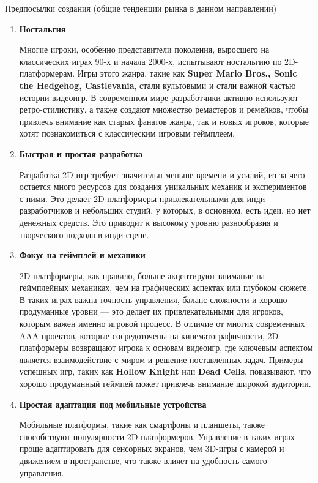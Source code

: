 \item Предпосылки создания (общие тенденции рынка в данном направлении)
\begin{enumerate}
    \item \textbf{Ностальгия} \par
    Многие игроки, особенно представители поколения, выросшего на классических играх 90-х и начала 2000-х, испытывают ностальгию по 2D-платформерам. Игры этого жанра, такие как \textbf{Super Mario Bros., Sonic the Hedgehog, Castlevania}, стали культовыми и стали важной частью истории видеоигр. В современном мире разработчики активно используют ретро-стилистику, а также создают множество ремастеров и ремейков, чтобы привлечь внимание как старых фанатов жанра, так и новых игроков, которые хотят познакомиться с классическим игровым геймплеем.
    \item\textbf{Быстрая и простая разработка} \par
    Разработка 2D-игр требует значительн меньше времени и усилий, из-за чего остается много ресурсов для создания уникальных механик и экспериментов с ними. Это делает 2D-платформеры привлекательными для инди-разработчиков и небольших студий, у которых, в основном, есть идеи, но нет денежных средств. Это приводит к высокому уровню разнообразия и творческого подхода в инди-сцене.
    \item \textbf{Фокус на геймплей и механики} \par
    2D-платформеры, как правило, больше акцентируют внимание на геймплейных механиках, чем на графических аспектах или глубоком сюжете. В таких играх важна точность управления, баланс сложности и хорошо продуманные уровни — это делает их привлекательными для игроков, которым важен именно игровой процесс. В отличие от многих современных AAA-проектов, которые сосредоточены на кинематографичности, 2D-платформеры возвращают игрока к основам видеоигр, где ключевым аспектом является взаимодействие с миром и решение поставленных задач. Примеры успешных игр, таких как \textbf{Hollow Knight} или \textbf{Dead Cells}, показывают, что хорошо продуманный геймпей может привлечь внимание широкой аудитории.
    \item \textbf{Простая адаптация под мобильные устройства} \par
    Мобильные платформы, такие как смартфоны и планшеты, также способствуют популярности 2D-платформеров. Управление в таких играх проще адаптировать для сенсорных экранов, чем 3D-игры с камерой и движением в пространстве, что также влияет на удобность самого управления.
\end{enumerate}